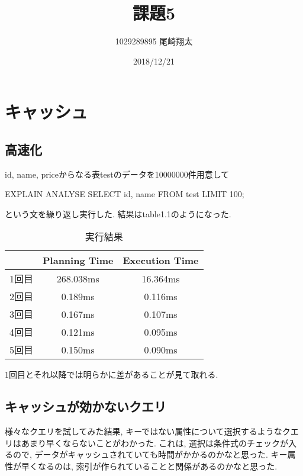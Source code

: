 \documentclass{jarticle}
\begin{document}
\title{課題5}
\author{1029289895 尾崎翔太}
\date{2018/12/21}

\maketitle
\newpage

\section{キャッシュ}
\subsection{高速化}
id, name, priceからなる表testのデータを10000000件用意して
\begin{varbatim}
EXPLAIN ANALYSE SELECT id, name FROM test LIMIT 100;
\end{varbatim}
という文を繰り返し実行した.
結果はtable1.1のようになった.
\begin{table}[htbp]
  \begin{tabular}{|c||c|c|} \hline
    & Planning Time & Execution Time \\ \hline \hline
    1回目 & 268.038ms & 16.364ms \\ \hline
    2回目 & 0.189ms & 0.116ms \\ \hline
    3回目 & 0.167ms & 0.107ms \\ \hline
    4回目 & 0.121ms & 0.095ms \\ \hline
    5回目 & 0.150ms & 0.090ms \\ \hline
  \end{tabular}
  \caption{実行結果}
  \centering
\end{table}
1回目とそれ以降では明らかに差があることが見て取れる.
\subsection{キャッシュが効かないクエリ}
様々なクエリを試してみた結果, キーではない属性について選択するようなクエリはあまり早くならないことがわかった. これは, 選択は条件式のチェックが入るので, データがキャッシュされていても時間がかかるのかなと思った. キー属性が早くなるのは, 索引が作られていることと関係があるのかなと思った.
\end{document}
